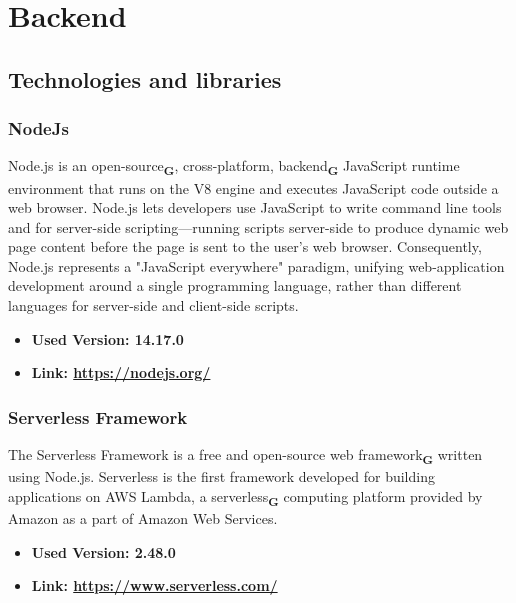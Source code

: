 \section{Backend}
\subsection{Technologies and libraries}
\subsubsection{NodeJs}
Node.js is an open-source\textsubscript{\textbf{G}}, cross-platform, backend\textsubscript{\textbf{G}} JavaScript runtime environment that runs on the
V8 engine and executes JavaScript code outside a web browser. Node.js lets developers use JavaScript
to write command line tools and for server-side scripting—running scripts server-side to produce
dynamic web page content before the page is sent to the user’s web browser. Consequently, Node.js
represents a "JavaScript everywhere" paradigm, unifying web-application development around a single
programming language, rather than different languages for server-side and client-side scripts.
\begin{itemize}
    \item \textbf{Used Version: 14.17.0}
    \item \textbf{Link: \url{https://nodejs.org/}}
\end{itemize}
\subsubsection{Serverless Framework}
The Serverless Framework is a free and open-source web framework\textsubscript{\textbf{G}} written using Node.js. Serverless is the first
framework developed for building applications on AWS Lambda, a serverless\textsubscript{\textbf{G}} computing platform provided
by Amazon as a part of Amazon Web Services.
\begin{itemize}
    \item \textbf{Used Version: 2.48.0}
    \item \textbf{Link: \url{https://www.serverless.com/}}
\end{itemize}
